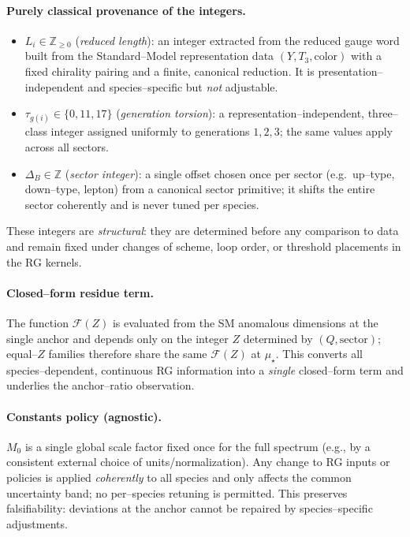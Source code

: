 \documentclass[epjc3]{svjour3}
\begin{document}
\paragraph{Purely classical provenance of the integers.}
\begin{itemize}
  \item \(L_i\in\mathbb Z_{\ge 0}\) (\emph{reduced length}): an integer extracted from the reduced gauge word built from the Standard–Model representation data \((Y,T_3,\text{color})\) with a fixed chirality pairing and a finite, canonical reduction. It is presentation–independent and species–specific but \emph{not} adjustable.
  \item \(\tau_{g(i)}\in\{0,11,17\}\) (\emph{generation torsion}): a representation–independent, three–class integer assigned uniformly to generations \(1,2,3\); the same values apply across all sectors.
  \item \(\Delta_B\in\mathbb Z\) (\emph{sector integer}): a single offset chosen once per sector (e.g.\ up–type, down–type, lepton) from a canonical sector primitive; it shifts the entire sector coherently and is never tuned per species.
\end{itemize}
These integers are \emph{structural}: they are determined before any comparison to data and remain fixed under changes of scheme, loop order, or threshold placements in the RG kernels.%

\paragraph{Closed–form residue term.}
The function \(\mathcal F(Z)\) is evaluated from the SM anomalous dimensions at the single anchor and depends only on the integer \(Z\) determined by \((Q,\text{sector})\); equal–\(Z\) families therefore share the same \(\mathcal F(Z)\) at \(\mu_\star\). This converts all species–dependent, continuous RG information into a \emph{single} closed–form term and underlies the anchor–ratio observation.

\paragraph{Constants policy (agnostic).}
\(M_0\) is a single global scale factor fixed once for the full spectrum (e.g., by a consistent external choice of units/normalization). Any change to RG inputs or policies is applied \emph{coherently} to all species and only affects the common uncertainty band; no per–species retuning is permitted. This preserves falsifiability: deviations at the anchor cannot be repaired by species–specific adjustments.
\end{document}
